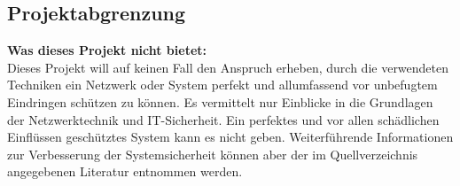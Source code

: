 \subsection{Projektabgrenzung} 
\label{sec:Projektabgrenzung}

	\textbf{Was dieses Projekt nicht bietet:}\\
    Dieses Projekt will auf keinen Fall den Anspruch erheben, durch die verwendeten Techniken ein Netzwerk oder System perfekt und allumfassend vor unbefugtem Eindringen schützen zu können. Es vermittelt nur Einblicke in die Grundlagen der Netzwerktechnik und IT-Sicherheit. Ein perfektes und vor allen schädlichen Einflüssen geschütztes System kann es nicht geben. Weiterführende Informationen zur Verbesserung der Systemsicherheit können aber der im Quellverzeichnis angegebenen Literatur entnommen werden.
